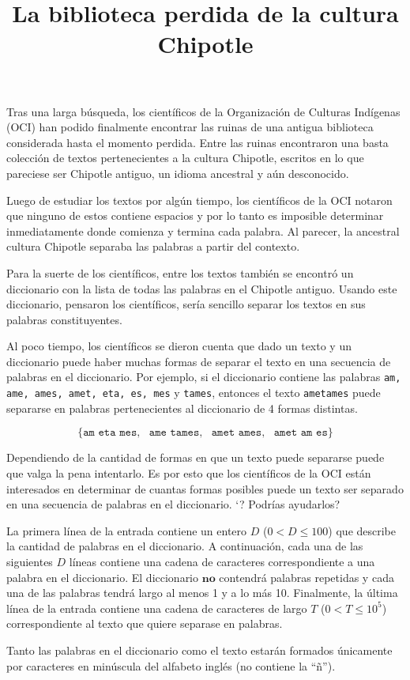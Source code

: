 \documentclass{oci}
\title{La biblioteca perdida de la cultura Chipotle}
\begin{document}
\begin{problemDescription}
Tras una larga búsqueda, los científicos de la Organización de Culturas
Indígenas (OCI) han podido finalmente encontrar las ruinas de una antigua
biblioteca considerada hasta el momento perdida.
Entre las ruinas encontraron una basta colección de textos pertenecientes a la
cultura Chipotle, escritos en lo que pareciese ser Chipotle antiguo, un idioma
ancestral y aún desconocido.

Luego de estudiar los textos por algún tiempo, los científicos de la OCI notaron
que ninguno de estos contiene espacios y por lo tanto es imposible determinar
inmediatamente donde comienza y termina cada palabra.
Al parecer, la ancestral cultura Chipotle separaba las palabras a partir del
contexto.

Para la suerte de los científicos, entre los textos también se encontró un
diccionario con la lista de todas las palabras en el Chipotle antiguo.
Usando este diccionario, pensaron los científicos, sería sencillo separar los
textos en sus palabras constituyentes.

Al poco tiempo, los científicos se dieron cuenta que dado un texto y un
diccionario puede haber muchas formas de separar el texto en una secuencia de
palabras en el diccionario.
Por ejemplo, si el diccionario contiene las palabras \texttt{am, ame, ames,
  amet, eta, es, mes} y \texttt{tames}, entonces el texto \texttt{ametames}
puede separarse en palabras pertenecientes al diccionario de 4 formas distintas.

$$\{\texttt{am eta mes},\ \ \  \texttt{ame tames},\ \ \  \texttt{amet ames},\ \ \  \texttt{amet am es}  \}$$


Dependiendo de la cantidad de formas en que un texto puede separarse puede que
valga la pena intentarlo.
Es por esto que los científicos de la OCI están interesados en determinar de
cuantas formas posibles puede un texto ser separado en una secuencia de palabras
en el diccionario.
`? Podrías ayudarlos?
\end{problemDescription}

\begin{inputDescription}
  La primera línea de la entrada contiene un entero $D$ ($0 < D \leq 100$) que
  describe la cantidad de palabras en el diccionario.
  A continuación, cada una de las siguientes $D$ líneas contiene una cadena de
  caracteres correspondiente a una palabra en el diccionario.
  El diccionario $\textbf{no}$ contendrá palabras repetidas y cada una de las
  palabras tendrá largo al menos 1 y a lo más 10.
  Finalmente, la última línea de la entrada contiene una cadena de caracteres de
  largo $T$ ($0 < T \leq 10^5$) correspondiente al texto que quiere separase en
  palabras.

  Tanto las palabras en el diccionario como el texto estarán formados
  únicamente por caracteres en minúscula del alfabeto inglés (no contiene la
  ``ñ'').
\end{inputDescription}
\end{document}
